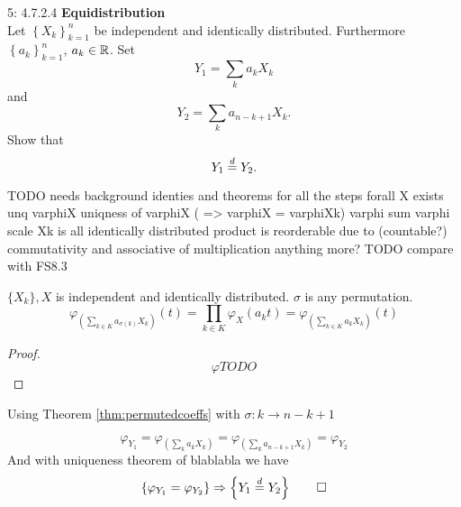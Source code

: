 \documentclass[a4paper,twoside=false,abstract=false,numbers=noenddot,
titlepage=false,headings=small,parskip=half,version=last]{scrartcl}
\begin{document}

\begin{exercise}{5: 4.7.2.4} \textbf{Equidistribution} \\
    Let $\left\{{X_k}\right\}_{k=1}^n$ be independent and identically
    distributed. Furthermore $\left\{{a_k}\right\}_{k=1}^n$, $a_k \in \mathbb{R}$. Set
    \begin{equation}
        Y_1 = \sum\limits_k a_k X_k
    \end{equation}
    and
    \begin{equation}
        Y_2 = \sum\limits_k a_{n-k+1} X_k.
    \end{equation}
    Show that
    \begin{equation}
        Y_1 \stackrel{d}{=} Y_2.
    \end{equation}
\end{exercise}
\begin{solution}
    TODO needs background identies and theorems for all the steps
    forall X exists unq varphiX
    uniqness of varphiX ( => varphiX = varphiXk)
    varphi sum
    varphi scale
    Xk is all identically distributed
    product is reorderable due to (countable?) commutativity and associative of
    multiplication
    anything more?
    TODO compare with FS8.3

    \begin{identity}
        \label{thm:permutedcoeffs}
        $\{X_k\}, X$ is independent and identically distributed.
        $\sigma$ is any permutation.
        \begin{equation}
            \varphi_{\left(\sum\limits_{k\in K}a_{\sigma(k)} X_k\right)}(t) =
            \prod\limits_{k\in K} \varphi_X (a_k t) =
            \varphi_{\left(\sum\limits_{k\in K}a_{k} X_k\right)}(t)
        \end{equation}
    \end{identity}
    \begin{proof}
        \begin{equation}
            \varphi TODO
        \end{equation}
    \end{proof}

    Using Theorem \ref{thm:permutedcoeffs} with
    $\sigma: k\rightarrow n-k+1$

    \begin{equation}
        \varphi_{Y_1} =
        \varphi_{\left(\sum\limits_k a_k X_k\right)} =
        \varphi_{\left(\sum\limits_k a_{n-k+1} X_k\right)} =
        \varphi_{Y_2}
    \end{equation}
    And with uniqueness theorem of blablabla we have
    \begin{equation}
        \left\{\varphi_{Y_1} = \varphi_{Y_2}\right\} \Rightarrow
        \left\{Y_1 \stackrel{d}{=} Y_2\right\} \qed
    \end{equation}
\end{solution}
\pagebreak
\end{document}
